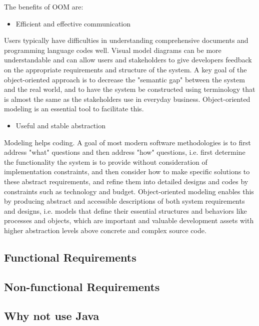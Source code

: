 \documentclass{acm_proc_article-sp}
\begin{document}
The benefits of OOM are:

\begin{itemize}
\item Efficient and effective communication
\end{itemize}

Users typically have difficulties in understanding comprehensive documents and programming language codes well. Visual model diagrams can be more understandable and can allow users and stakeholders to give developers feedback on the appropriate requirements and structure of the system. A key goal of the object-oriented approach is to decrease the "semantic gap" between the system and the real world, and to have the system be constructed using terminology that is almost the same as the stakeholders use in everyday business. Object-oriented modeling is an essential tool to facilitate this.

\begin{itemize}
\item Useful and stable abstraction
\end{itemize}

Modeling helps coding. A goal of most modern software methodologies is to first address "what" questions and then address "how" questions, i.e. first determine the functionality the system is to provide without consideration of implementation constraints, and then consider how to make specific solutions to these abstract requirements, and refine them into detailed designs and codes by constraints such as technology and budget. Object-oriented modeling enables this by producing abstract and accessible descriptions of both system requirements and designs, i.e. models that define their essential structures and behaviors like processes and objects, which are important and valuable development assets with higher abstraction levels above concrete and complex source code.
\subsection{Functional Requirements}
 
\subsection{Non-functional Requirements}

\subsection{Why not use Java}
\end{document}
